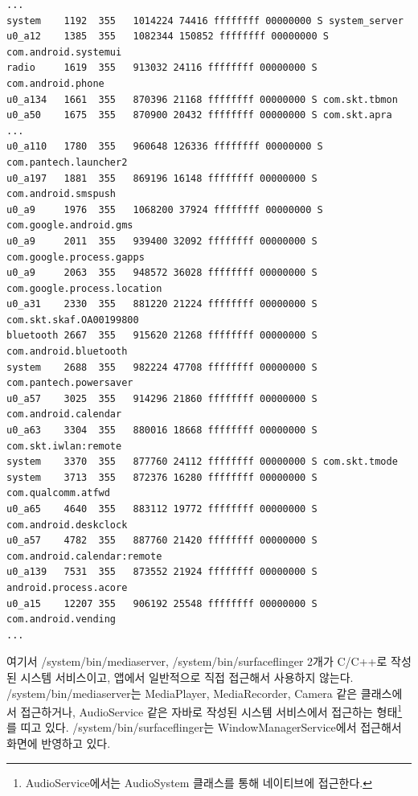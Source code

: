 \begin{lstlisting}[frame=single]
...
system    1192  355   1014224 74416 ffffffff 00000000 S system_server
u0_a12    1385  355   1082344 150852 ffffffff 00000000 S com.android.systemui
radio     1619  355   913032 24116 ffffffff 00000000 S com.android.phone
u0_a134   1661  355   870396 21168 ffffffff 00000000 S com.skt.tbmon
u0_a50    1675  355   870900 20432 ffffffff 00000000 S com.skt.apra
...
u0_a110   1780  355   960648 126336 ffffffff 00000000 S com.pantech.launcher2
u0_a197   1881  355   869196 16148 ffffffff 00000000 S com.android.smspush
u0_a9     1976  355   1068200 37924 ffffffff 00000000 S com.google.android.gms
u0_a9     2011  355   939400 32092 ffffffff 00000000 S com.google.process.gapps
u0_a9     2063  355   948572 36028 ffffffff 00000000 S com.google.process.location
u0_a31    2330  355   881220 21224 ffffffff 00000000 S com.skt.skaf.OA00199800
bluetooth 2667  355   915620 21268 ffffffff 00000000 S com.android.bluetooth
system    2688  355   982224 47708 ffffffff 00000000 S com.pantech.powersaver
u0_a57    3025  355   914296 21860 ffffffff 00000000 S com.android.calendar
u0_a63    3304  355   880016 18668 ffffffff 00000000 S com.skt.iwlan:remote
system    3370  355   877760 24112 ffffffff 00000000 S com.skt.tmode
system    3713  355   872376 16280 ffffffff 00000000 S com.qualcomm.atfwd
u0_a65    4640  355   883112 19772 ffffffff 00000000 S com.android.deskclock
u0_a57    4782  355   887760 21420 ffffffff 00000000 S com.android.calendar:remote
u0_a139   7531  355   873552 21924 ffffffff 00000000 S android.process.acore
u0_a15    12207 355   906192 25548 ffffffff 00000000 S com.android.vending
...
\end{lstlisting}

여기서 /system/bin/mediaserver, /system/bin/surfaceflinger 2개가 C/C++로 작성된 시스템 서비스이고, 앱에서 일반적으로 직접 접근해서 사용하지 않는다.
/system/bin/mediaserver는 MediaPlayer, MediaRecorder, Camera 같은 클래스에서 접근하거나, AudioService 같은 자바로 작성된 시스템 서비스에서 접근하는 형태\footnote{AudioService에서는 AudioSystem 클래스를 통해 네이티브에 접근한다.}를 띠고 있다.
/system/bin/surfaceflinger는 WindowManagerService에서 접근해서 화면에 반영하고 있다.\\

